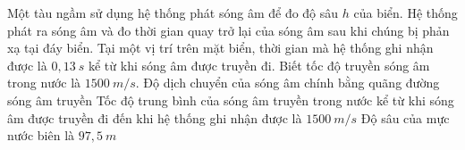 \begin{ex}%
Một tàu ngầm sử dụng hệ thống phát sóng âm để đo độ sâu $h$ của biển. Hệ thống phát ra sóng âm và đo thời gian quay trở lại của sóng âm sau khi chúng bị phản xạ tại đáy biển. Tại một vị trí trên mặt biển, thời gian mà hệ thống ghi nhận được là $0,13 \ s$ kể từ khi sóng âm được truyền đi. Biết tốc độ truyền sóng âm trong nước là $1500 \ m/s$.
{Độ dịch chuyển của sóng âm chính bằng quãng đường sóng âm truyền} 
{\True Tốc độ trung bình của sóng âm truyền trong nước kể từ khi sóng âm được truyền đi đến khi hệ thống ghi nhận được là $1500 \ m/s$} 
{\True Độ sâu của mực nước biên là $97,5 \ m$} 
\loigiai{ 
\begin{itemchoice}
\itemch
\itemch
\itemch
\itemch
\end{itemchoice}
}
\end{ex}


